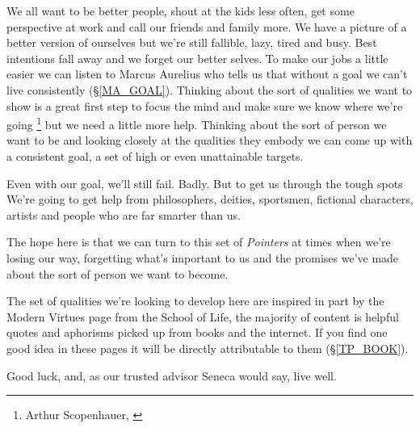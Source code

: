 
\cleardoublepage

\begin{multicols}{2}

We all want to be better people, shout at the kids less often, get some perspective at work and call our friends and family more. We have a picture of a better version of ourselves but we're still fallible, lazy, tired and busy. Best intentions fall away and we forget our better selves. 
To make our jobs a little easier we can listen to Marcus Aurelius who tells us that without a goal we can't live consistently (\S \ref{MA_GOAL}). Thinking about the sort of qualities we want to show is a great first step to focus the mind and make sure we know where we're going \footnote{Arthur Scopenhauer, \cite{SCM}} but we need a little more help. Thinking about the sort of person we want to be and looking closely at the qualities they embody we can come up with a consistent goal, a set of high or even unattainable targets. 

Even with our goal, we'll still fail. Badly. But to get us through the tough spots We're going to get help from philosophers, deities, sportsmen, fictional characters, artists and people who are far smarter than us. 

The hope here is that we can turn to this set of \emph{Pointers} at times when we're losing our way, forgetting what's important to us and the promises we've made about the sort of person we want to become.

The set of qualities we're looking to develop here are inspired in part by the Modern Virtues page from the School of Life, the majority of content is helpful quotes and aphorisms picked up from books and the internet. If you find one good idea in these pages it will be directly attributable to them (\S \ref{TP_BOOK}). 

Good luck, and, as our trusted advisor Seneca would say, live well.

\end{multicols}